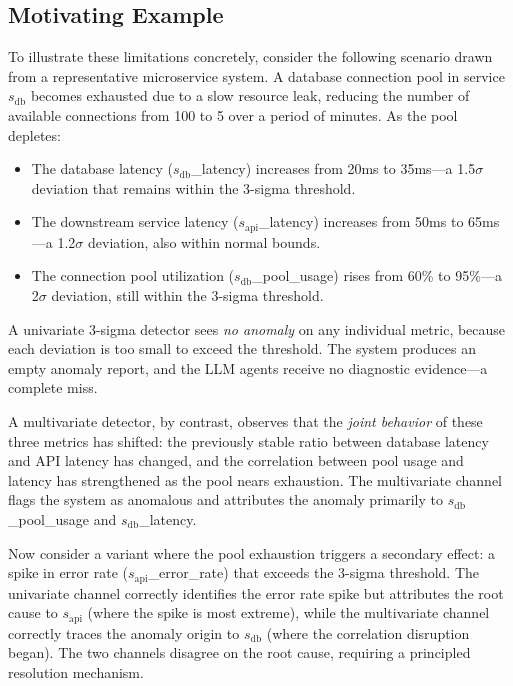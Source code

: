 \documentclass[a4paper,fleqn]{cas-dc}
\begin{document}
\subsection{Motivating Example}

To illustrate these limitations concretely, consider the following scenario drawn from a representative microservice system.  A database connection pool in service $s_{\text{db}}$ becomes exhausted due to a slow resource leak, reducing the number of available connections from 100 to 5 over a period of minutes.  As the pool depletes:

\begin{itemize}[leftmargin=*]
  \item The database latency ($s_{\text{db}}$\_latency) increases from 20ms to 35ms---a 1.5$\sigma$ deviation that remains within the 3-sigma threshold.
  \item The downstream service latency ($s_{\text{api}}$\_latency) increases from 50ms to 65ms---a 1.2$\sigma$ deviation, also within normal bounds.
  \item The connection pool utilization ($s_{\text{db}}$\_pool\_usage) rises from 60\% to 95\%---a 2$\sigma$ deviation, still within the 3-sigma threshold.
\end{itemize}

A univariate 3-sigma detector sees \emph{no anomaly} on any individual metric, because each deviation is too small to exceed the threshold.  The system produces an empty anomaly report, and the LLM agents receive no diagnostic evidence---a complete miss.

A multivariate detector, by contrast, observes that the \emph{joint behavior} of these three metrics has shifted: the previously stable ratio between database latency and API latency has changed, and the correlation between pool usage and latency has strengthened as the pool nears exhaustion.  The multivariate channel flags the system as anomalous and attributes the anomaly primarily to $s_{\text{db}}$\_pool\_usage and $s_{\text{db}}$\_latency.

Now consider a variant where the pool exhaustion triggers a secondary effect: a spike in error rate ($s_{\text{api}}$\_error\_rate) that exceeds the 3-sigma threshold.  The univariate channel correctly identifies the error rate spike but attributes the root cause to $s_{\text{api}}$ (where the spike is most extreme), while the multivariate channel correctly traces the anomaly origin to $s_{\text{db}}$ (where the correlation disruption began).  The two channels disagree on the root cause, requiring a principled resolution mechanism.
\end{document}
